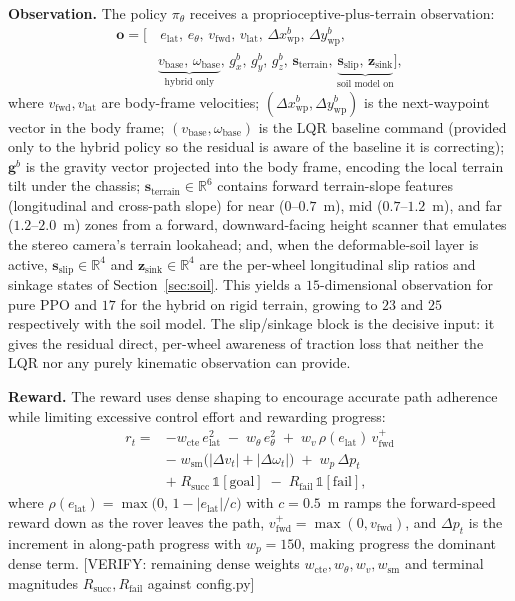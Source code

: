 \documentclass[conference]{IEEEtran}
\newcommand{\verify}[1]{\textcolor{BrickRed}{[VERIFY: #1]}}
\begin{document}
\vspace{1mm}
\noindent\textbf{Observation.} The policy $\pi_\theta$ receives a proprioceptive-plus-terrain observation:
\begin{align}
\mathbf{o} = \big[ &\, e_{\text{lat}},\, e_{\theta},\, v_{\text{fwd}},\, v_{\text{lat}},\, \Delta x^{b}_{\text{wp}},\, \Delta y^{b}_{\text{wp}}, \nonumber\\
& \underbrace{v_{\text{base}},\, \omega_{\text{base}}}_{\text{hybrid only}},\, g^{b}_{x},\, g^{b}_{y},\, g^{b}_{z},\, \mathbf{s}_{\text{terrain}},\, \underbrace{\mathbf{s}_{\text{slip}},\, \mathbf{z}_{\text{sink}}}_{\text{soil model on}} \big],
\end{align}
where $v_{\text{fwd}}, v_{\text{lat}}$ are body-frame velocities; $(\Delta x^{b}_{\text{wp}}, \Delta y^{b}_{\text{wp}})$ is the next-waypoint vector in the body frame; $(v_{\text{base}},\omega_{\text{base}})$ is the LQR baseline command (provided only to the hybrid policy so the residual is aware of the baseline it is correcting); $\mathbf{g}^{b}$ is the gravity vector projected into the body frame, encoding the local terrain tilt under the chassis; $\mathbf{s}_{\text{terrain}}\in\mathbb{R}^{6}$ contains forward terrain-slope features (longitudinal and cross-path slope) for near ($0$--$0.7$~m), mid ($0.7$--$1.2$~m), and far ($1.2$--$2.0$~m) zones from a forward, downward-facing height scanner that emulates the stereo camera's terrain lookahead; and, when the deformable-soil layer is active, $\mathbf{s}_{\text{slip}}\in\mathbb{R}^{4}$ and $\mathbf{z}_{\text{sink}}\in\mathbb{R}^{4}$ are the per-wheel longitudinal slip ratios and sinkage states of Section~\ref{sec:soil}. This yields a $15$-dimensional observation for pure PPO and $17$ for the hybrid on rigid terrain, growing to $23$ and $25$ respectively with the soil model. The slip/sinkage block is the decisive input: it gives the residual direct, per-wheel awareness of traction loss that neither the LQR nor any purely kinematic observation can provide.

\vspace{1mm}
\noindent\textbf{Reward.} The reward uses dense shaping to encourage accurate path adherence while limiting excessive control effort and rewarding progress:
\begin{align}
r_t = &-w_{\text{cte}}\, e_{\text{lat}}^2 \;-\; w_{\theta}\, e_{\theta}^2 \;+\; w_{v}\, \rho(e_{\text{lat}})\, v_{\text{fwd}}^{+} \nonumber\\
& -\; w_{\text{sm}}\big(|\Delta v_t| + |\Delta\omega_t|\big) \;+\; w_{p}\, \Delta p_t \nonumber\\
& +\; R_{\text{succ}}\,\mathbb{1}[\text{goal}] \;-\; R_{\text{fail}}\,\mathbb{1}[\text{fail}],
\end{align}
where $\rho(e_{\text{lat}}) = \max\!\big(0,\,1 - |e_{\text{lat}}|/c\big)$ with $c=0.5$~m ramps the forward-speed reward down as the rover leaves the path, $v_{\text{fwd}}^{+}=\max(0,v_{\text{fwd}})$, and $\Delta p_t$ is the increment in along-path progress with $w_p = 150$, making progress the dominant dense term. \verify{remaining dense weights $w_{\text{cte}}, w_{\theta}, w_{v}, w_{\text{sm}}$ and terminal magnitudes $R_{\text{succ}}, R_{\text{fail}}$ against config.py}
\end{document}
